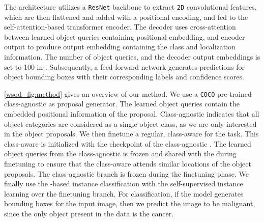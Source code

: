 %
The \detr \cite{detr} architecture utilizes a \texttt{ResNet} \cite{resnet} backbone to extract \texttt{2D} convolutional features, which are then flattened and added with a positional encoding, and fed to the self-attention-based transformer encoder. The decoder uses cross-attention between learned object queries containing positional embedding, and encoder output to produce output embedding containing the class and localization information. The number of object queries, and the decoder output embeddings is set to 100 in \detr. Subsequently, a feed-forward network generates predictions for object bounding boxes with their corresponding labels and confidence scores. 

%
\cref{wsod_fig:method} gives an overview of our method. We use a \texttt{COCO} pre-trained class-agnostic \detr as proposal generator. The learned object queries contain the embedded positional information of the proposal. Class-agnostic indicates that all object categories are considered as a single object class, as we are only interested in the object proposals. We then finetune a regular, class-aware \detr for the \wsod task. This class-aware \detr is initialized with the checkpoint of the class-agnostic \detr. The learned object queries from the class-agnostic \detr is frozen and shared with the \wsod \detr during finetuning to ensure that the class-aware \detr attends similar locations of the object proposals. The class-agnostic \detr branch is frozen during the finetuning phase. We finally use the \mil-based instance classification with the self-supervised instance learning over the finetuning branch. For \gbc classification, if the model generates bounding boxes for the input image, then we predict the image to be malignant, since the only object present in the data is the cancer. 

